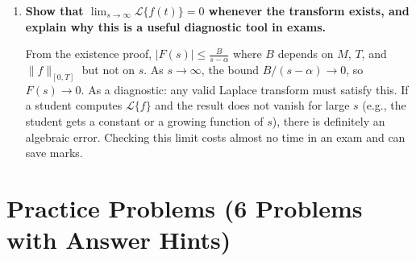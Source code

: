 \documentclass[12pt,a4paper]{article}
\begin{document}
\begin{enumerate}[label=\textbf{D\arabic*.}]
A \emph{sufficient} condition is one whose satisfaction guarantees existence; a \emph{necessary} condition is one that must hold whenever existence holds. Piecewise continuity + exponential order is a \emph{sufficient} condition: if both hold, the transform definitely exists. It is \emph{not necessary}: $f(t) = t^{-1/2}$ fails piecewise continuity (infinite singularity at 0) yet has $\mathcal{L}\{t^{-1/2}\} = \sqrt{\pi/s}$. The only known \emph{necessary} condition is the much weaker requirement that $F(s) \to 0$ as $s \to \infty$. So the sufficient condition is useful for guaranteeing existence; the necessary condition is useful for detecting errors.

\item \textbf{Show that $\lim_{s \to \infty} \mathcal{L}\{f(t)\} = 0$ whenever the transform exists, and explain why this is a useful diagnostic tool in exams.}

From the existence proof, $|F(s)| \leq \frac{B}{s-\alpha}$ where $B$ depends on $M$, $T$, and $\|f\|_{[0,T]}$ but not on $s$. As $s \to \infty$, the bound $B/(s-\alpha) \to 0$, so $F(s) \to 0$. As a diagnostic: any valid Laplace transform must satisfy this. If a student computes $\mathcal{L}\{f\}$ and the result does not vanish for large $s$ (e.g., the student gets a constant or a growing function of $s$), there is definitely an algebraic error. Checking this limit costs almost no time in an exam and can save marks.

\end{enumerate}

\section{Practice Problems (6 Problems with Answer Hints)}
\end{document}

